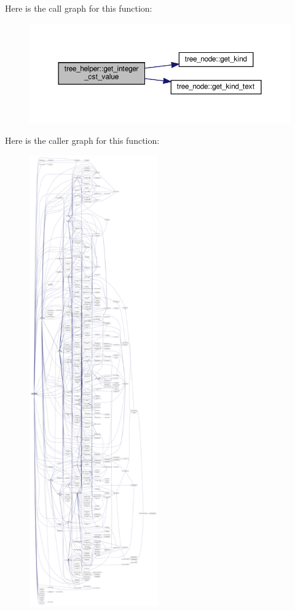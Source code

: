 Here is the call graph for this function\+:
\nopagebreak
\begin{figure}[H]
\begin{center}
\leavevmode
\includegraphics[width=350pt]{d7/d99/classtree__helper_a697d99d005531eaac44d83d19225f02b_cgraph}
\end{center}
\end{figure}
Here is the caller graph for this function\+:
\nopagebreak
\begin{figure}[H]
\begin{center}
\leavevmode
\includegraphics[height=550pt]{d7/d99/classtree__helper_a697d99d005531eaac44d83d19225f02b_icgraph}
\end{center}
\end{figure}
\mbox{\label{classtree__helper_a39ce89663878170eee6f6c9bed7efc65}} 
